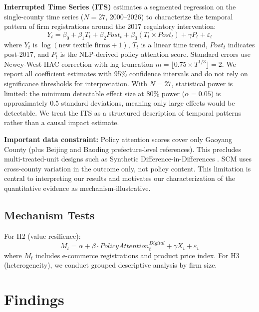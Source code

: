 \documentclass[sustainability,article,submit,moreauthors,pdftex]{mdpi}
\begin{document}
\textbf{Interrupted Time Series (ITS)} \citep{Bernal2017} estimates a segmented regression on the single-county time series ($N=27$, 2000--2026) to characterize the temporal pattern of firm registrations around the 2017 regulatory intervention:
\begin{equation}
    Y_t = \beta_0 + \beta_1 T_t + \beta_2 Post_t + \beta_3 (T_t \times Post_t) + \gamma P_t + \varepsilon_t
\end{equation}
where $Y_t$ is $\log(\text{new textile firms} + 1)$, $T_t$ is a linear time trend, $Post_t$ indicates post-2017, and $P_t$ is the NLP-derived policy attention score. Standard errors use Newey-West HAC correction \citep{Newey1987} with lag truncation $m = \lfloor 0.75 \times T^{1/3} \rfloor = 2$. We report all coefficient estimates with 95\% confidence intervals and do not rely on significance thresholds for interpretation. With $N=27$, statistical power is limited: the minimum detectable effect size at 80\% power ($\alpha=0.05$) is approximately $0.5$ standard deviations, meaning only large effects would be detectable. We treat the ITS as a structured description of temporal patterns rather than a causal impact estimate.

\textbf{Important data constraint:} Policy attention scores cover only Gaoyang County (plus Beijing and Baoding prefecture-level references). This precludes multi-treated-unit designs such as Synthetic Difference-in-Differences \citep{Arkhangelsky2021}. SCM uses cross-county variation in the outcome only, not policy content. This limitation is central to interpreting our results and motivates our characterization of the quantitative evidence as mechanism-illustrative.

\subsection{Mechanism Tests}
For H2 (value resilience):
\begin{equation}
    M_t = \alpha + \beta \cdot PolicyAttention^{Digital}_t + \gamma X_t + \varepsilon_t
\end{equation}
where $M_t$ includes e-commerce registrations and product price index. For H3 (heterogeneity), we conduct grouped descriptive analysis by firm size.
\section{Findings}\label{sec:results}
\end{document}
